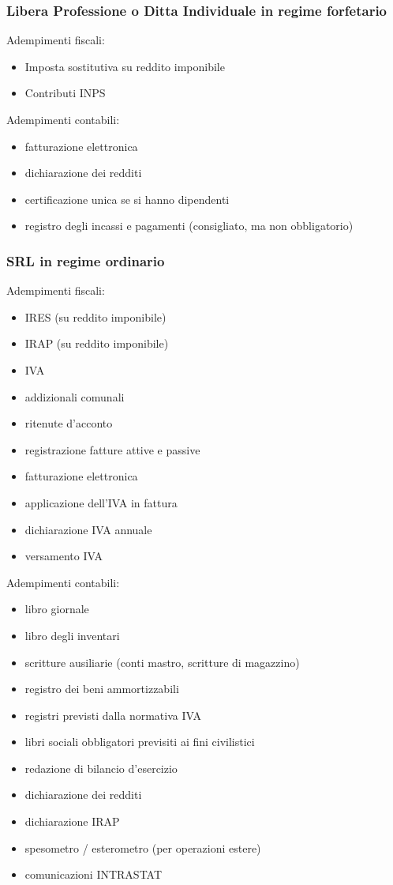 \documentclass{article}
\begin{document}
\subsubsection{Libera Professione o Ditta Individuale in regime forfetario}
Adempimenti fiscali:
\begin{itemize}
    \item Imposta sostitutiva su reddito imponibile
    \item Contributi INPS
\end{itemize}

Adempimenti contabili:
\begin{itemize}
    \item fatturazione elettronica
    \item dichiarazione dei redditi
    \item certificazione unica se si hanno dipendenti
    \item registro degli incassi e pagamenti (consigliato, ma non obbligatorio)
\end{itemize}



\subsubsection{SRL in regime ordinario}
Adempimenti fiscali:
\begin{itemize}
    \item IRES (su reddito imponibile)
    \item IRAP (su reddito imponibile)
    \item IVA
    \item addizionali comunali
    \item ritenute d'acconto
    \item registrazione fatture attive e passive
    \item fatturazione elettronica
    \item applicazione dell'IVA in fattura
    \item dichiarazione IVA annuale
    \item versamento IVA
\end{itemize}
Adempimenti contabili:
\begin{itemize}
    \item libro giornale
    \item libro degli inventari
    \item scritture ausiliarie (conti mastro, scritture di magazzino)
    \item registro dei beni ammortizzabili
    \item registri previsti dalla normativa IVA
    \item libri sociali obbligatori previsiti ai fini civilistici
    \item redazione di bilancio d'esercizio
    \item dichiarazione dei redditi
    \item dichiarazione IRAP
    \item spesometro / esterometro (per operazioni estere)
    \item comunicazioni INTRASTAT
\end{itemize}
\end{document}

